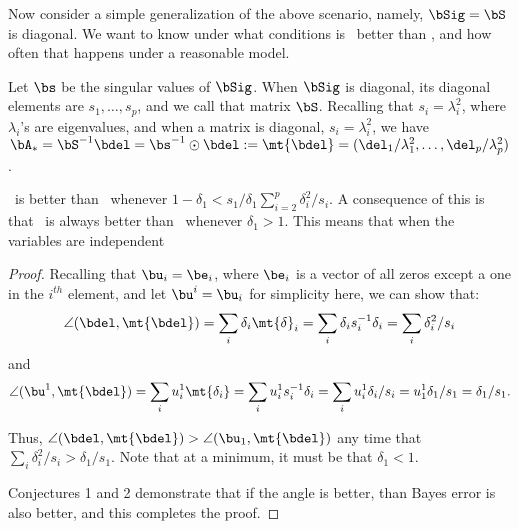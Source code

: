 \documentclass[10pt]{article}
\begin{document}
Now consider a simple generalization of the above scenario, namely, $\bSig=\bS$ is diagonal.
We want to know under what conditions is \Lol~better than \Pca, and how often that happens under a reasonable model. 


Let $\bs$ be the singular values of $\bSig$.  When $\bSig$ is diagonal, its diagonal elements are $s_1,\ldots,s_p$, and we call that matrix $\bS$. 
Recalling that $s_i=\lambda_i^2$, where $\lambda_i$'s are eigenvalues, and when a matrix is diagonal, $s_i=\lambda_i^2$, we have  $\bA_*=\bS^{-1} \bdel=\bs^{-1} \odot \bdel := \mt{\bdel} =(\del_1/\lambda_1^2,\ldots,\del_p/\lambda_p^2)$.



\begin{lem}
\Lol~is better than \Pca~whenever $1-\delta_1 < {s_1}/{\delta_1} \sum_{i=2}^p {\delta_i^2}/{s_i}$.
A consequence of this is that \Lol~is always better than \Pca~whenever $\delta_1>1$.
This means that when the variables are independent
\end{lem}



\begin{proof}
Recalling that $\bu_i=\be_i$, where $\be_i$ is a vector of all zeros except a one in the $i^{th}$ element, and let $\bu^i=\bu_i$ for simplicity here, we can show that:
$$
\angle(\bdel,\mt{\bdel}) =
\sum_i \delta_i \mt{\delta}_i =
\sum_i \delta_i s^{-1}_i \delta_i =
\sum_i \delta_i^2 / s_i 
$$
and
$$
\angle(\bu^1, \mt{\bdel})  = \sum_i u^1_i \mt{\delta_i} =  \sum_i u^1_i s^{-1}_i {\delta_i}= \sum_i u^1_i {\delta_i} /s_i =  u^1_1 {\delta_1} /s_1=  {\delta_1} /s_1.
$$

Thus, $\angle(\bdel,\mt{\bdel}) > \angle(\bu_1, \mt{\bdel})$ any time that
$\sum_i \delta_i^2 / s_i > \delta_1 / s_1$. 
Note that at a minimum, it must be that $\delta_1 < 1$.

Conjectures 1 and 2 demonstrate that if the angle is better, than Bayes error is also better, and this completes the proof.
\end{proof}


\end{document}
